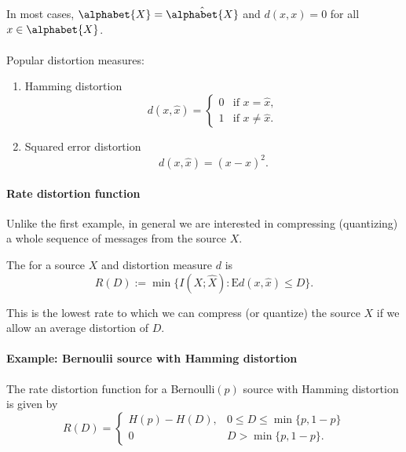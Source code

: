 \documentclass[a4paper, 11pt, openany]{book}
\begin{document}
In most cases, $\alphabet{X} = \hat{\alphabet{X}}$ and $d(x,x) = 0$ for all $x \in \alphabet{X}$.\\
~\\
Popular distortion measures:
\begin{enumerate}
	\item Hamming distortion
	$$
		d(x,\hat{x}) = \begin{cases}
		0 &\text{if } x = \hat{x},\\
		1&\text{if } x \ne \hat{x}.
		\end{cases}
	$$

	\item Squared error distortion
	$$
		d(x,\hat{x}) = (x - \hat{x})^2.
	$$
\end{enumerate}




\paragraph{Rate distortion function}

Unlike the first example, in general we are interested in compressing (quantizing) a whole sequence of messages from the source $X$.

\begin{definition}
The  for a source $X$ and distortion measure $d$ is
$$
	R(D) := \min \{ I(X; \hat{X}) : \mathrm{E} d(x,\hat{x}) \le D\}.
$$
\end{definition}

This is the lowest rate to which we can compress (or quantize) the source $X$ if we allow an average distortion of $D$.




\paragraph{Example: Bernoulii source with Hamming distortion}

\begin{theorem}
The rate distortion function for a Bernoulli$(p)$ source with Hamming distortion is given by
$$
	R(D) = \begin{cases}
	H(p) - H(D), & 0 \le D \le \min\{p,1-p\}\\
	0 & D > \min\{p,1-p\}.
	\end{cases}
$$
\end{theorem}
\end{document}
